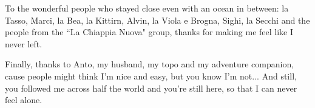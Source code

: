 \documentclass[letterpaper,12pt]{yalephd}
\begin{document}
To the wonderful people who stayed close even with an ocean in between: la Tasso, Marci, la Bea, la Kittirn, Alvin, la Viola e Brogna, Sighi, la Secchi and the people from the ``La Chiappia Nuova" group, thanks for making me feel like I never left.

Finally, thanks to Anto, my husband, my topo and my adventure companion, cause people might think I'm nice and easy, but you know I'm not... And still, you followed me across half the world and you're still here, so that I can never feel alone.



\mainmatter










\appendix










\backmatter


%
\end{document}
